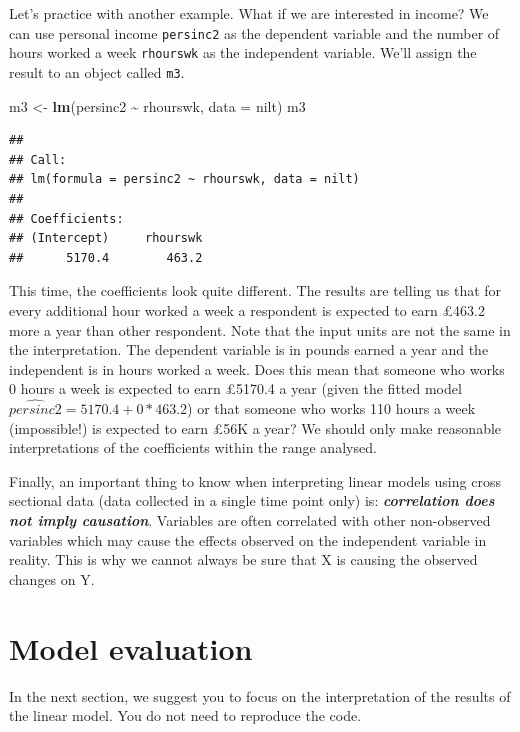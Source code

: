 \documentclass[
]{book}
\newenvironment{Shaded}{\begin{snugshade}}{\end{snugshade}}
\newcommand{\AttributeTok}[1]{\textcolor[rgb]{0.13,0.29,0.53}{#1}}
\newcommand{\FunctionTok}[1]{\textcolor[rgb]{0.13,0.29,0.53}{\textbf{#1}}}
\newcommand{\NormalTok}[1]{#1}
\newcommand{\OtherTok}[1]{\textcolor[rgb]{0.56,0.35,0.01}{#1}}
\newcommand{\SpecialCharTok}[1]{\textcolor[rgb]{0.81,0.36,0.00}{\textbf{#1}}}
\begin{document}
Let's practice with another example. What if we are interested in income? We can use personal income \texttt{persinc2} as the dependent variable and the number of hours worked a week \texttt{rhourswk} as the independent variable. We'll assign the result to an object called \texttt{m3}.

\begin{Shaded}
\begin{Highlighting}[]
\NormalTok{m3 }\OtherTok{\textless{}{-}} \FunctionTok{lm}\NormalTok{(persinc2 }\SpecialCharTok{\textasciitilde{}}\NormalTok{ rhourswk, }\AttributeTok{data =}\NormalTok{ nilt)}
\NormalTok{m3}
\end{Highlighting}
\end{Shaded}

\begin{verbatim}
## 
## Call:
## lm(formula = persinc2 ~ rhourswk, data = nilt)
## 
## Coefficients:
## (Intercept)     rhourswk  
##      5170.4        463.2
\end{verbatim}

This time, the coefficients look quite different. The results are telling us that for every additional hour worked a week a respondent is expected to earn £463.2 more a year than other respondent. Note that the input units are not the same in the interpretation. The dependent variable is in pounds earned a year and the independent is in hours worked a week. Does this mean that someone who works 0 hours a week is expected to earn £5170.4 a year (given the fitted model \(\hat{persinc2} = 5170.4 + 0*463.2\)) or that someone who works 110 hours a week (impossible!) is expected to earn £56K a year? We should only make reasonable interpretations of the coefficients within the range analysed.

Finally, an important thing to know when interpreting linear models using cross sectional data (data collected in a single time point only) is: \textbf{\emph{correlation does not imply causation}}. Variables are often correlated with other non-observed variables which may cause the effects observed on the independent variable in reality. This is why we cannot always be sure that X is causing the observed changes on Y.

\hypertarget{model-evaluation}{%
\section{Model evaluation}\label{model-evaluation}}

In the next section, we suggest you to focus on the interpretation of the results of the linear model. You do not need to reproduce the code.
\end{document}
